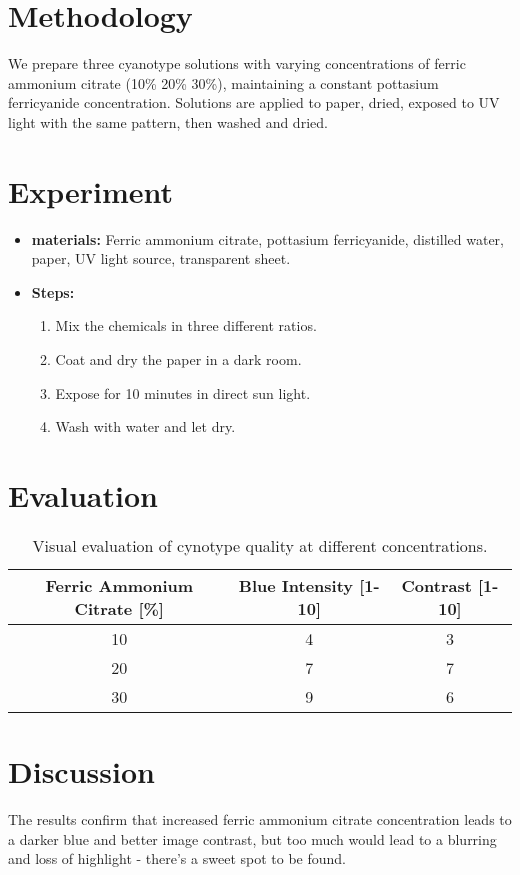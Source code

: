\documentclass[a4paper,12pt]{article}
\begin{document}
\section{Methodology}
We prepare three cyanotype solutions with varying concentrations of ferric ammonium citrate (10\% 20\% 30\%), maintaining a constant pottasium ferricyanide concentration. Solutions are applied to paper, dried, exposed to UV light with the same pattern, then washed and dried.

\section{Experiment}
\begin{itemize}
  \item \textbf{materials:} Ferric ammonium citrate, pottasium ferricyanide, distilled water, paper, UV light source, transparent sheet.
  \item \textbf{Steps:}
  \begin{enumerate}
    \item Mix the chemicals in three different ratios.
    \item Coat and dry the paper in a dark room.
    \item Expose for 10 minutes in direct sun light.
    \item Wash with water and let dry.
  \end{enumerate}
\end{itemize}

\section{Evaluation}

\begin{table}[h]
\centering
\begin{tabular}{ccc}
\toprule
\textbf{Ferric Ammonium Citrate [\%]} & \textbf{Blue Intensity [1-10]} & \textbf{Contrast [1-10]} \\
\midrule
10 & 4 & 3 \\
20 & 7 & 7 \\
30 & 9 & 6 \\
\bottomrule
\end{tabular}
\caption{Visual evaluation of cynotype quality at different concentrations.}
\label{tab:results}
\end{table}

\section{Discussion}
The results confirm that increased ferric ammonium citrate concentration leads to a darker blue and better image contrast, but too much would lead to a blurring and loss of highlight - there's a sweet spot to be found.
\end{document}
